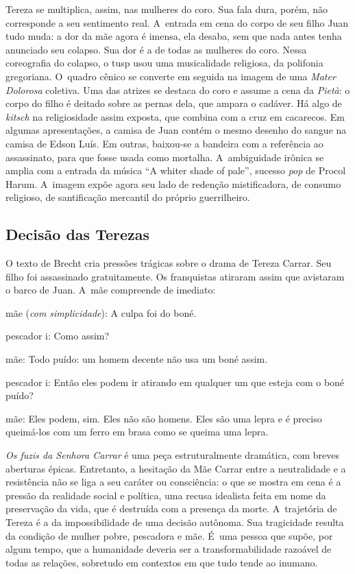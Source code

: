 Tereza se multiplica, assim, nas mulheres do coro. Sua fala dura, porém,
não corresponde a seu sentimento real. A~entrada em cena do corpo de seu
filho Juan tudo muda: a dor da mãe agora é imensa, ela desaba, sem que
nada antes tenha anunciado seu colapso. Sua dor é a de todas as
mulheres do coro. Nessa coreografia do colapso, o {\sc tusp} usou uma
musicalidade religiosa, da polifonia gregoriana. O~quadro cênico se
converte em seguida na imagem de uma {\it Mater Dolorosa} coletiva. Uma
das atrizes se destaca do coro e assume a cena da {\it Pietà}: o corpo
do filho é deitado sobre as pernas dela, que ampara o cadáver. Há algo
de {\it kitsch} na religiosidade assim exposta, que combina com a cruz
em cacarecos. Em algumas apresentações, a camisa de Juan contém o mesmo
desenho do sangue na camisa de Edson Luís. Em outras, baixou-se a
bandeira com a referência ao assassinato, para que fosse usada como
mortalha. A~ambiguidade irônica se amplia com a entrada da música “A
whiter shade of pale”, sucesso {\it pop} de Procol Harum. A~imagem expõe
agora seu lado de redenção mistificadora, de consumo religioso, de
santificação mercantil do próprio guerrilheiro.


\subsection{Decisão das Terezas}

O texto de Brecht cria pressões trágicas sobre o drama de Tereza Carrar.
Seu filho foi assassinado gratuitamente. Os franquistas atiraram assim
que avistaram o barco de Juan. A~mãe compreende de imediato:

\startblockquote
{\sc mãe} ({\it com simplicidade}): A culpa foi do boné.

{\sc pescador i}: Como assim?

{\sc mãe}: Todo puído: um homem decente não usa um boné assim.

{\sc pescador i}: Então eles podem ir atirando em qualquer um que esteja com
o boné puído?

{\sc mãe}: Eles podem, sim. Eles não são homens. Eles são uma lepra e é
preciso queimá-los com um ferro em brasa como se queima uma lepra.
\stopblockquote

{\it Os fuzis da Senhora Carrar} é uma peça estruturalmente dramática,
com breves aberturas épicas. Entretanto, a hesitação da Mãe Carrar entre
a neutralidade e a resistência não se liga a seu caráter ou consciência:
o que se mostra em cena é a pressão da realidade social e política, uma
recusa idealista feita em nome da preservação da vida, que é destruída
com a presença da morte. A~trajetória de Tereza é a da impossibilidade
de uma decisão autônoma. Sua tragicidade resulta da condição de mulher
pobre, pescadora e mãe. É~uma pessoa que supõe, por algum tempo, que a
humanidade deveria ser a transformabilidade razoável de todas as
relações, sobretudo em contextos em que tudo tende ao inumano.

